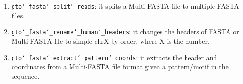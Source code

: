 \begin{enumerate}
\item \texttt{gto\char`_fasta\char`_split\char`_reads}: it splits a Multi-FASTA file to multiple FASTA files.

\item \texttt{gto\char`_fasta\char`_rename\char`_human\char`_headers}: it changes the headers of FASTA or Multi-FASTA file to simple chrX by order, where X is the number.

\item \texttt{gto\char`_fasta\char`_extract\char`_pattern\char`_coords}: it extracts the header and coordinates from a Multi-FASTA file format given a pattern/motif in the sequence.

\end{enumerate}





 






